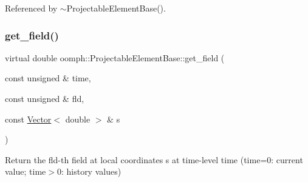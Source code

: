 Referenced by $\sim$\+Projectable\+Element\+Base().

\mbox{\label{classoomph_1_1ProjectableElementBase_ae4da5b565b6d333be2f5920f7be763cd}} 
\subsubsection{\texorpdfstring{get\+\_\+field()}{get\_field()}}
{\footnotesize\ttfamily virtual double oomph\+::\+Projectable\+Element\+Base\+::get\+\_\+field (\begin{DoxyParamCaption}\item[{const unsigned \&}]{time,  }\item[{const unsigned \&}]{fld,  }\item[{const \hyperlink{classoomph_1_1Vector}{Vector}$<$ double $>$ \&}]{s }\end{DoxyParamCaption})\hspace{0.3cm}{\ttfamily [pure virtual]}}



Return the fld-\/th field at local coordinates s at time-\/level time (time=0\+: current value; time$>$0\+: history values) 



